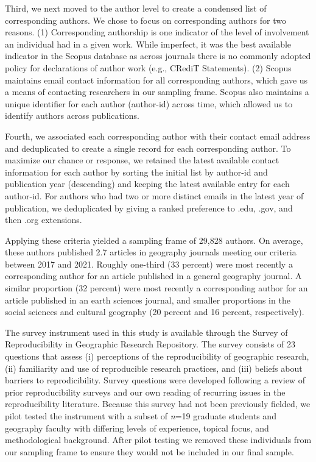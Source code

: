 \documentclass[]{interact}
\theoremstyle{plain}%
\theoremstyle{definition}
\theoremstyle{remark}
\begin{document}
Third, we next moved to the author level to create a condensed list of corresponding authors. 
We chose to focus on corresponding authors for two reasons. 
(1) Corresponding authorship is one indicator of the level of involvement an individual had in a given work. 
While imperfect, it was the best available indicator in the Scopus database as across journals there is no commonly adopted policy for declarations of author work (e.g., CRediT Statements).
(2) Scopus maintains email contact information for all corresponding authors, which gave us a means of contacting researchers in our sampling frame.
Scopus also maintains a unique identifier for each author (author-id) across time, which allowed us to identify authors across publications. 

Fourth, we associated each corresponding author with their contact email address and deduplicated to create a single record for each corresponding author. 
To maximize our chance or response, we retained the latest available contact information for each author by sorting the initial list by author-id and publication year (descending) and keeping the latest available entry for each author-id. 
For authors who had two or more distinct emails in the latest year of publication, we deduplicated by giving a ranked preference to .edu, .gov, and then .org extensions.

Applying these criteria yielded a sampling frame of 29,828 authors. 
On average, these authors published 2.7 articles in geography journals meeting our criteria between 2017 and 2021. 
Roughly one-third (33 percent) were most recently a corresponding author for an article published in a general geography journal. 
A similar proportion (32 percent) were most recently a corresponding author for an article published in an earth sciences journal, and smaller proportions in the social sciences and cultural geography (20 percent and 16 percent, respectively).

The survey instrument used in this study is available through the Survey of Reproducibility in Geographic Research Repository.
The survey consists of 23 questions that assess (i) perceptions of the reproducibility of geographic research, (ii) familiarity and use of reproducible research practices, and (iii) beliefs about barriers to reprodicibility. 
Survey questions were developed following a review of prior reproducibility surveys \citep[e.g.,][]{fanelli2009many,baker20161, konkol2019} and our own reading of recurring issues in the reproducibility literature. 
Because this survey had not been previously fielded, we pilot tested the instrument with a subset of \textit{n}=19 graduate students and geography faculty with differing levels of experience, topical focus, and methodological background. 
After pilot testing we removed these individuals from our sampling frame to ensure they would not be included in our final sample.
\end{document}
